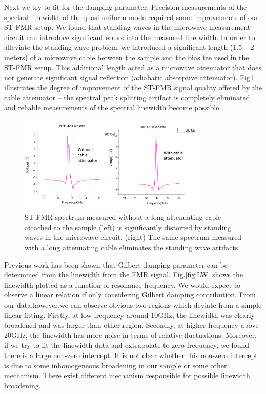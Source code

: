 Next we try to fit for the damping parameter. Precision measurements of the spectral linewidth of the quasi-uniform mode required some improvements of our ST-FMR setup. We found that standing waves in the microwave measurement circuit can introduce significant errors into the measured line width. In order to alleviate the standing wave problem, we introduced a significant length (1.5 – 2 meters) of a microwave cable between the sample and the bias tee used in the ST-FMR setup. This additional length acted as a microwave attenuator that does not generate significant signal reflection (adiabatic absorptive attenuator). Fig\ref{fig:cable} illustrates the degree of improvement of the ST-FMR signal quality offered by the cable attenuator – the spectral peak splitting artifact is completely eliminated and reliable measurements of the spectral linewidth become possible.

\begin{figure}[!ht]
  \includegraphics[width=0.8\textwidth]{fig/FieldMod/Improve-measure.png}
  \centering
  \caption{ST-FMR spectrum measured without a long attenuating cable attached to the sample (left) is significantly distorted by standing waves in the microwave circuit. (right) The same spectrum measured with a long attenuating cable eliminates the standing wave artifacts. }
  \label{fig:cable}
\end{figure}






Previous work has been shown that Gilbert damping parameter can be determined from the linewidth from the FMR signal\cite{Bias}. Fig.\ref{fig:LW} shows the linewidth plotted as a function of resonance frequency. We would expect to observe a linear relation if only considering Gilbert damping contribution. From our data,however,we can observe obvious two regions which deviate from a simple linear fitting. Firstly, at low frequency around 10GHz, the linewidth was clearly broadened and was larger than other region. Secondly, at higher frequency above 20GHz, the linewidth has more noise in terms of relative fluctuations. Moreover, if we try to fit the linewidth data and extrapolate to zero frequency, we found there is a large non-zero intercept. It is not clear whether this non-zero intercept is due to some inhomogeneous broadening in our sample or some other mechanism. There exist different mechanism responsible for possible linewidth broadening\cite{3-Magon}.

